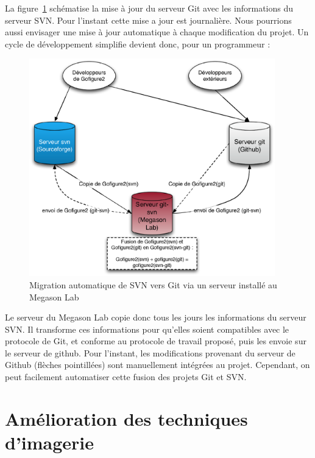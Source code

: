 La figure~\ref{fig:MigrationGit} schématise la mise à jour du serveur Git avec les informations du serveur SVN.
Pour l'instant cette mise a jour est journalière.
Nous pourrions aussi envisager une mise à jour automatique à chaque modification du projet.
Un cycle de développement simplifie devient donc, pour un programmeur :
\begin{figure}[h]
\begin{center}
\leavevmode
\includegraphics[width=0.95\textwidth]{pictures/GitTransfert}
\end{center}
\caption{Migration automatique de SVN vers Git via un serveur installé au Megason Lab}
\label{fig:MigrationGit}
\end{figure}
Le serveur du Megason Lab copie donc tous les jours les informations du serveur SVN.
Il transforme ces informations pour qu'elles soient compatibles avec le protocole de Git,
et conforme au protocole de travail proposé, puis les envoie sur le serveur de github.
Pour l'instant, les modifications provenant du serveur de Github (flèches pointillées)
sont manuellement intégrées au projet. Cependant, on peut facilement automatiser cette fusion des projets Git et SVN.

\clearpage



\section{Amélioration des techniques d'imagerie}

